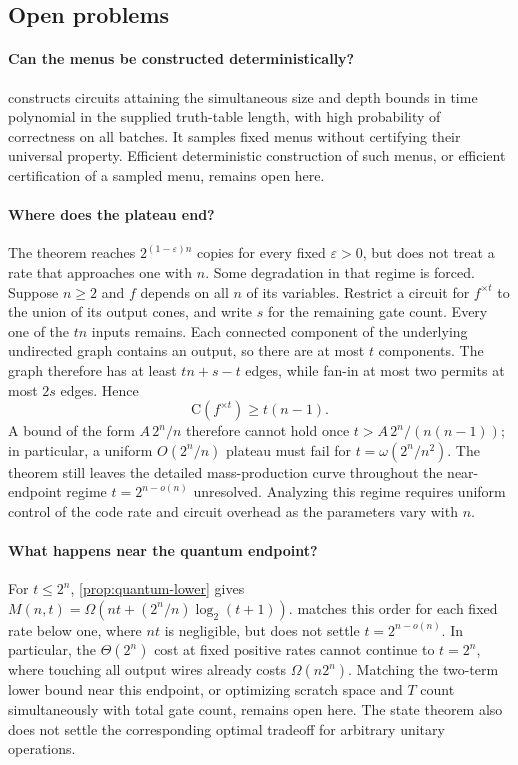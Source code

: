 \documentclass[11pt]{article}
\newcommand{\C}{\mathrm{C}}
\begin{document}
\subsection{Open problems}

\paragraph{Can the menus be constructed deterministically?}
 constructs circuits attaining the
simultaneous size and depth bounds in time polynomial in the supplied
truth-table length, with high probability of correctness on all batches.
It samples fixed menus without certifying their universal property.
Efficient deterministic construction of such menus, or efficient
certification of a sampled menu, remains open here.

\paragraph{Where does the plateau end?}
The theorem reaches $2^{(1-\varepsilon)n}$ copies for every fixed
$\varepsilon>0$, but does not treat a rate that approaches one with $n$.
Some degradation in that regime is forced.  Suppose $n\ge2$ and $f$ depends
on all $n$ of its variables.  Restrict a circuit for $f^{\times t}$ to the
union of its output cones, and write $s$ for the remaining gate count.
Every one of the $tn$ inputs remains.  Each connected component of the
underlying undirected graph contains an output, so there are at most $t$
components.  The graph therefore has at least $tn+s-t$ edges, while fan-in
at most two permits at most $2s$ edges.  Hence
\[
  \C(f^{\times t})\ge t(n-1).
\]
A bound of the form $A\,2^n/n$ therefore cannot hold once
$t>A\,2^n/(n(n-1))$; in particular, a uniform $O(2^n/n)$ plateau must fail for
$t=\omega(2^n/n^2)$.  The theorem still leaves the detailed mass-production
curve throughout the near-endpoint regime $t=2^{n-o(n)}$ unresolved.
Analyzing this regime requires uniform control of the code rate and circuit
overhead as the parameters vary with $n$.

\paragraph{What happens near the quantum endpoint?}
For $t\le2^n$, \cref{prop:quantum-lower} gives
$M(n,t)=\Omega(nt+(2^n/n)\log_2(t+1))$.
 matches this order for each fixed rate below one,
where $nt$ is negligible, but does not settle $t=2^{n-o(n)}$.
In particular, the $\Theta(2^n)$ cost at fixed positive rates cannot
continue to $t=2^n$, where touching all output wires already costs
$\Omega(n2^n)$.  Matching the two-term lower bound near this endpoint,
or optimizing scratch space and $T$ count simultaneously with total
gate count, remains open here.  The state theorem also does not settle
the corresponding optimal tradeoff for arbitrary unitary operations.
\end{document}
